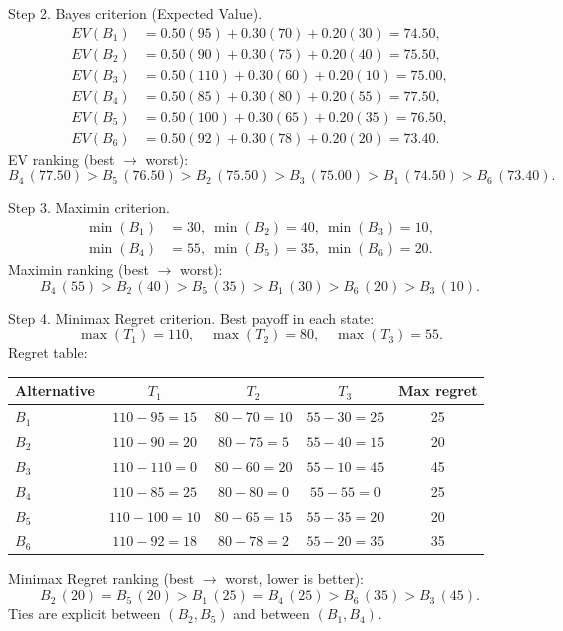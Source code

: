 \begin{ExamProblems}
		Step 2. Bayes criterion (Expected Value).
		\[
		\begin{aligned}
		EV(B_1)&=0.50(95)+0.30(70)+0.20(30)=74.50,\\
		EV(B_2)&=0.50(90)+0.30(75)+0.20(40)=75.50,\\
		EV(B_3)&=0.50(110)+0.30(60)+0.20(10)=75.00,\\
		EV(B_4)&=0.50(85)+0.30(80)+0.20(55)=77.50,\\
		EV(B_5)&=0.50(100)+0.30(65)+0.20(35)=76.50,\\
		EV(B_6)&=0.50(92)+0.30(78)+0.20(20)=73.40.
		\end{aligned}
		\]
		EV ranking (best $\to$ worst):
		\[
		B_4\,(77.50)>B_5\,(76.50)>B_2\,(75.50)>B_3\,(75.00)>B_1\,(74.50)>B_6\,(73.40).
		\]

		Step 3. Maximin criterion.
		\[
		\begin{aligned}
		\min(B_1)&=30,\ \min(B_2)=40,\ \min(B_3)=10,\\
		\min(B_4)&=55,\ \min(B_5)=35,\ \min(B_6)=20.
		\end{aligned}
		\]
		Maximin ranking (best $\to$ worst):
		\[
		B_4\,(55)>B_2\,(40)>B_5\,(35)>B_1\,(30)>B_6\,(20)>B_3\,(10).
		\]

		Step 4. Minimax Regret criterion.
		Best payoff in each state:
		\[
		\max(T_1)=110,\quad \max(T_2)=80,\quad \max(T_3)=55.
		\]
		Regret table:
		\begin{center}
			\begin{tabular}{l c c c c}
				\toprule
				Alternative & $T_1$ & $T_2$ & $T_3$ & Max regret \\
				\midrule
				$B_1$ & $110-95=15$ & $80-70=10$ & $55-30=25$ & 25 \\
				$B_2$ & $110-90=20$ & $80-75=5$ & $55-40=15$ & 20 \\
				$B_3$ & $110-110=0$ & $80-60=20$ & $55-10=45$ & 45 \\
				$B_4$ & $110-85=25$ & $80-80=0$ & $55-55=0$ & 25 \\
				$B_5$ & $110-100=10$ & $80-65=15$ & $55-35=20$ & 20 \\
				$B_6$ & $110-92=18$ & $80-78=2$ & $55-20=35$ & 35 \\
				\bottomrule
			\end{tabular}
		\end{center}
		Minimax Regret ranking (best $\to$ worst, lower is better):
		\[
		B_2\,(20)=B_5\,(20)>B_1\,(25)=B_4\,(25)>B_6\,(35)>B_3\,(45).
		\]
		Ties are explicit between $(B_2,B_5)$ and between $(B_1,B_4)$.


\end{ExamProblems}
